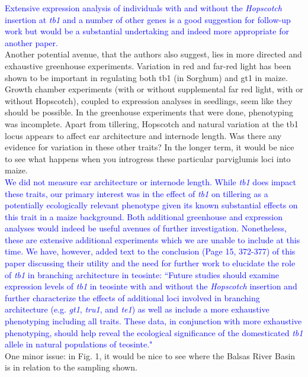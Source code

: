 \documentclass[11pt]{article}
\newcommand{\res}[1]{\noindent \textcolor{blue}{{#1}} \\}
\begin{document}
\res{Extensive expression analysis of individuals with and without the \emph{Hopscotch} insertion at \emph{tb1} and a number of other genes is a good suggestion for follow-up work but would be a substantial undertaking and indeed more appropriate for another paper. }

Another potential avenue, that the authors also suggest, lies in more directed and exhaustive greenhouse experiments. Variation in red and far-red light has been shown to be important in regulating both tb1 (in Sorghum) and gt1 in maize. Growth chamber experiments (with or without supplemental far red light, with or without Hopscotch), coupled to expression analyses in seedlings, seem like they should be possible.  In the greenhouse experiments that were done, phenotyping was incomplete. Apart from tillering, Hopscotch and natural variation at the tb1 locus appears to affect ear architecture and internode length. Was there any evidence for variation in these other traits? In the longer term, it would be nice to see what happens when you introgress these particular parviglumis loci into maize.\\ 

\res{We did not measure ear architecture or internode length. 
While \emph{tb1} does impact these traits, our primary interest was in the effect of \emph{tb1} on tillering as a potentially ecologically relevant phenotype given its known substantial effects on this trait in a maize background.
Both additional greenhouse and expression analyses would indeed be useful avenues of further investigation.
Nonetheless, these are extensive additional experiments which we are unable to include at this time. 
We have, however, added text to the conclusion (Page 15, 372-377) of this paper discussing their utility and the need for further work to elucidate the role of \emph{tb1} in branching architecture in teosinte:
``Future studies should examine expression levels of \emph{tb1} in teosinte with and without the \emph{Hopscotch} insertion and further characterize the effects of additional loci involved in branching architecture (e.g. \emph{gt1}, \emph{tru1}, and \emph{te1}) as well as include a more exhaustive phenotyping including all traits.  
These data, in conjunction with more exhaustive phenotyping, should help reveal the ecological significance of the domesticated \emph{tb1} allele in natural populations of teosinte."}

One minor issue: in Fig. 1, it would be nice to see where the Balsas River Basin is in relation to the sampling shown. 
\end{document}
